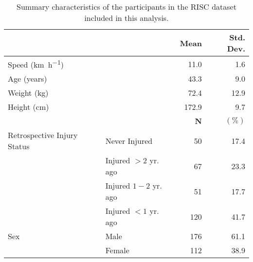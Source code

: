\begin{table}
\centering
\begin{tabular}[t]{llrr}
\toprule
  &    & \textbf{Mean} & \textbf{Std. Dev.}\\
\midrule
Speed (\si{\km \per \hour}) &  & 11.0 & 1.6\\
Age (years) &  & 43.3 & 9.0\\
Weight (kg) &  & 72.4 & 12.9\\
Height (cm) &  & 172.9 & 9.7\\
\midrule
 &  & \textbf{N} & $\mathbf{\mathbf{(\%)}}$\\
\midrule
Retrospective Injury Status & Never Injured & 50 & 17.4\\
 & Injured $>2$ yr. ago & 67 & 23.3\\
 & Injured $1-2$ yr. ago & 51 & 17.7\\
 & Injured $<1$ yr. ago & 120 & 41.7\\
Sex & Male & 176 & 61.1\\
 & Female & 112 & 38.9\\
\bottomrule
\end{tabular}
\caption{Summary characteristics of the participants in the RISC dataset included in this analysis.}
\label{tab:tab1chpt3.}
\end{table}
